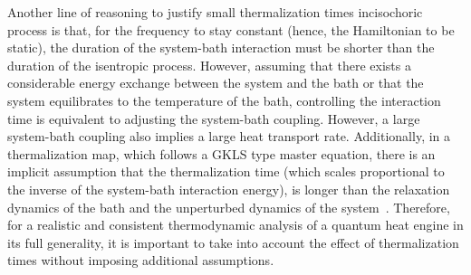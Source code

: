 \documentclass[aps,pra,twocolumn,showpacs,showkeys,groupedaddress,nobalancelastpage,nofootinbib,floatfix,superscriptaddress,longbibliography]{revtex4-2}
\begin{document}
Another line of reasoning to justify small thermalization times incisochoric process is that, for the frequency to stay constant (hence, the Hamiltonian to be static), the duration of the system-bath interaction must be shorter than the duration of the isentropic process. However, assuming that there exists a considerable energy exchange between the system and the bath or that the system equilibrates to the temperature of the bath, controlling the
interaction time is equivalent to adjusting the system-bath coupling. However, a large system-bath coupling also implies a large heat transport rate. Additionally, in a thermalization map, which follows a GKLS type master equation, there is an implicit assumption that the thermalization time (which scales proportional to the inverse of the system-bath interaction energy), is longer than the relaxation dynamics of the bath and the unperturbed dynamics of the
system~\cite{1979}. Therefore, for a realistic and consistent thermodynamic analysis of a quantum heat engine in its full generality, it is important to take into account the effect of thermalization times without imposing additional assumptions.\\
\end{document}
